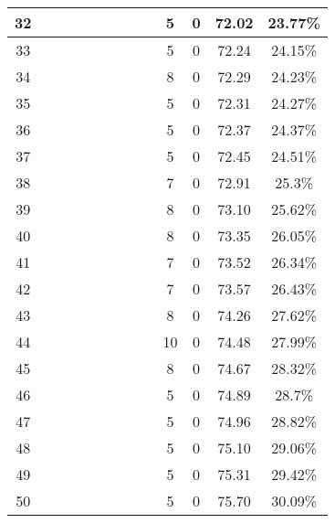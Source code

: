 \begin{longtable}{|c|c|c|c|c|c|c|c|c|c|c|c|c|}
32 &  \x    & \x    & \x    & \x    & \x    &       &       & \x    & 5 & 0 & 72.02 & 23.77\% \\ \hline
33 &  \x    & \x    & \x    & \x    & \x\m  &       & \x    &       & 5 & 0 & 72.24 & 24.15\% \\ \hline
34 &  \x    & \x    & \x    &       & \x\m  & \x    & \x\m  &       & 8 & 0 & 72.29 & 24.23\% \\ \hline
35 &  \x    & \x    & \x    &       & \x\m  & \x\m  &       &       & 5 & 0 & 72.31 & 24.27\% \\ \hline
36 &  \x    & \x    & \x    & \x    & \x    & \x    &       & \x\m  & 5 & 0 & 72.37 & 24.37\% \\ \hline
37 &  \x    & \x    & \x    &       & \x    & \x    &       & \x    & 5 & 0 & 72.45 & 24.51\% \\ \hline
38 &  \x    & \x    & \x    & \x    & \x    & \x\m  &       & \x\m  & 7 & 0 & 72.91 & 25.3\% \\ \hline
39 &  \x    & \x    &       &       & \x\m  & \x\m  & \x\m  &       & 8 & 0 & 73.10 & 25.62\% \\ \hline
40 &  \x    & \x    & \x    & \x    & \x\m  &       &       &       & 8 & 0 & 73.35 & 26.05\% \\ \hline
41 &  \x    & \x    & \x    &       & \x    &       &       & \x    & 7 & 0 & 73.52 & 26.34\% \\ \hline
42 &  \x    & \x    & \x    &       & \x    & \x\m  &       & \x\m  & 7 & 0 & 73.57 & 26.43\% \\ \hline
43 &  \x    & \x    & \x    &       &       & \x    &       & \x\m  & 8 & 0 & 74.26 & 27.62\% \\ \hline
44 &  \x    & \x    &       &       & \x\m  & \x\m  &       &       & 10 & 0 & 74.48 & 27.99\% \\ \hline
45 &  \x    & \x    & \x    &       & \x    &       &       & \x\m  & 8 & 0 & 74.67 & 28.32\% \\ \hline
46 &  \x    & \x    & \x    & \x    & \x\m  & \x    &       &       & 5 & 0 & 74.89 & 28.7\% \\ \hline
47 &  \x    & \x    & \x    &       & \x    &       & \x    &       & 5 & 0 & 74.96 & 28.82\% \\ \hline
48 &  \x    & \x    & \x    & \x    & \x    & \x    & \x    &       & 5 & 0 & 75.10 & 29.06\% \\ \hline
49 &  \x    & \x    &       & \x    & \x    &       &       & \x    & 5 & 0 & 75.31 & 29.42\% \\ \hline
50 &  \x    & \x    & \x    & \x    & \x    & \x    & \x\m  &       & 5 & 0 & 75.70 & 30.09\% \\ \hline

\end{longtable}
